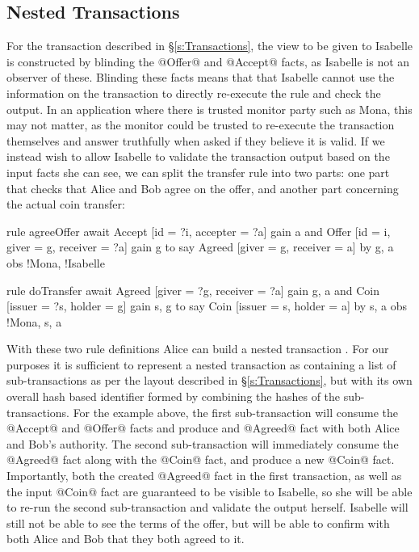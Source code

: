 \subsection{Nested Transactions}
\label{s:NestedTransactions}
For the transaction described in \S\ref{s:Transactions}, the view to be given to Isabelle is constructed by blinding the @Offer@ and @Accept@ facts, as Isabelle is not an observer of these. Blinding these facts means that that Isabelle cannot use the information on the transaction to directly re-execute the rule and check the output. In an application where there is trusted monitor party such as Mona, this may not matter, as the monitor could be trusted to re-execute the transaction themselves and answer truthfully when asked if they believe it is valid. If we instead wish to allow Isabelle to validate the transaction output based on the input facts she can see, we can split the transfer rule into two parts: one part that checks that Alice and Bob agree on the offer, and another part concerning the actual coin transfer:

\begin{small}
\begin{code}
  rule  agreeOffer
  await Accept [id = ?i, accepter = ?a]            gain {a}
    and Offer  [id = i,  giver = g, receiver = ?a] gain {g}
  to
   say  Agreed [giver = g,   receiver = a]
    by  {g, a} obs {!Mona, !Isabelle}

  rule  doTransfer
  await Agreed [giver  = ?g, receiver = ?a] gain {g, a}
   and  Coin   [issuer = ?s, holder   = g]  gain {s, g}
  to
   say  Coin   [issuer = s,  holder   = a]
    by  {s, a} obs {!Mona, s, a}
\end{code}
\end{small}

With these two rule definitions Alice can build a nested transaction \CITE. For our purposes it is sufficient to represent a nested transaction as containing a list of sub-transactions as per the layout described in \S\ref{s:Transactions}, but with its own overall hash based identifier formed by combining the hashes of the sub-transactions. For the example above, the first sub-transaction will consume the @Accept@ and @Offer@ facts and produce and @Agreed@ fact with both Alice and Bob's authority. The second sub-transaction will immediately consume the @Agreed@ fact along with the @Coin@ fact, and produce a new @Coin@ fact. Importantly, both the created @Agreed@ fact in the first transaction, as well as the input @Coin@ fact are guaranteed to be visible to Isabelle, so she will be able to re-run the second sub-transaction and validate the output herself. Isabelle will still not be able to see the terms of the offer, but will be able to confirm with both Alice and Bob that they both agreed to it.


